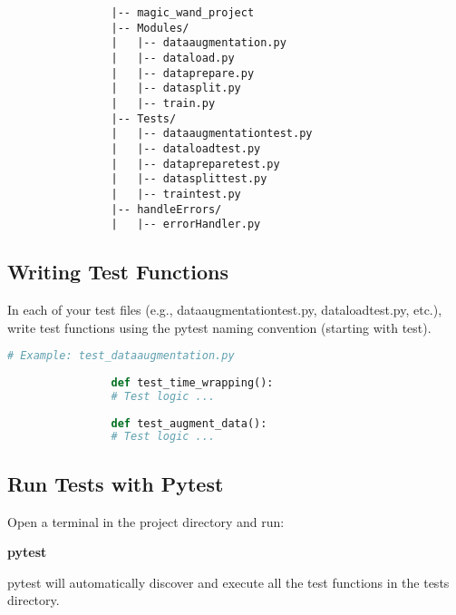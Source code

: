 			\begin{verbatim}
				|-- magic_wand_project
				|-- Modules/
				|   |-- dataaugmentation.py
				|   |-- dataload.py
				|   |-- dataprepare.py
				|   |-- datasplit.py
				|   |-- train.py
				|-- Tests/
				|   |-- dataaugmentationtest.py
				|   |-- dataloadtest.py
				|   |-- datapreparetest.py
				|   |-- datasplittest.py
				|   |-- traintest.py
				|-- handleErrors/
				|   |-- errorHandler.py
			\end{verbatim}
		
			\subsection{Writing Test Functions}
			
			In each of your test files (e.g., dataaugmentationtest.py, dataloadtest.py, etc.), write test functions using the pytest naming convention (starting with test).
		
			\begin{lstlisting}[language=Python, caption={Example of Test Functions for Data Augmentation}, label={code:test-dataaugmentation}, style=pythonstyle]
				# Example: test_dataaugmentation.py
				
				def test_time_wrapping():
				# Test logic ...
				
				def test_augment_data():
				# Test logic ...
			\end{lstlisting}
			
			\subsection{Run Tests with Pytest}
			
			Open a terminal in the project directory and run:
			
			\textbf{pytest}
			
			pytest will automatically discover and execute all the test functions in the tests directory.
			

